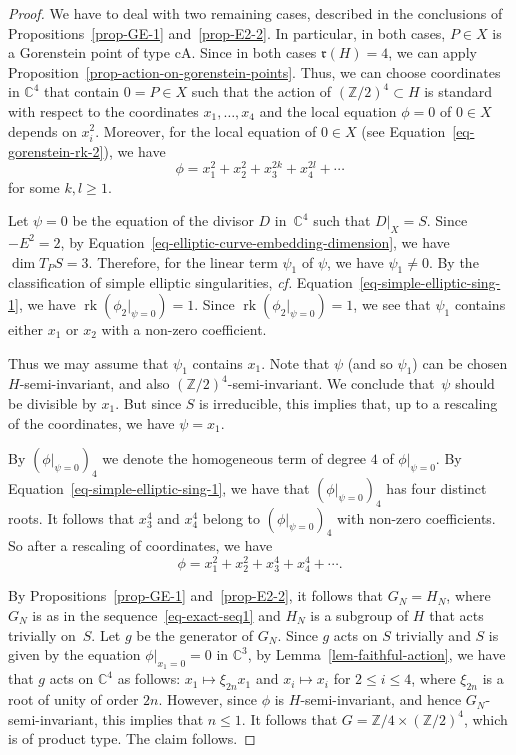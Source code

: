\documentclass[11pt]{amsart}
\numberwithin{equation}{section}
\theoremstyle{definition}
\theoremstyle{remark}
\DeclareMathOperator{\rk}{rk}
\begin{document}
\begin{proof}
  We have to deal with two remaining cases, described in the conclusions of Propositions~\ref{prop-GE-1} and~\ref{prop-E2-2}. In particular, in both cases, $P\in X$ is a Gorenstein point of type cA.  Since in both cases $\mathfrak{r}(H)=4$, we can apply Proposition~\ref{prop-action-on-gorenstein-points}.  Thus, we can choose coordinates in $\mathbb{C}^4$ that contain
  $0=P\in X$ such that the action of $(\mathbb{Z}/2)^4\subset H$ is standard with respect to the coordinates $x_1,\ldots, x_4$ and the local equation $\phi=0$ of $0\in X$ depends on $x_i^2$.  Moreover, for the local equation of $0\in X$ (see Equation~\eqref{eq-gorenstein-rk-2}), we have
\begin{equation}
\label{eq-phi-psi-equation}
\phi = x_1^2 + x_2^2 + x_3^{2k} + x_4^{2l} + \cdots
\end{equation}
for some $k, l\geq 1$. 

Let $\psi=0$ be the equation of the divisor $D$ in~$\mathbb{C}^4$ such that $D|_X = S$. Since $-E^2=2$, by Equation~\eqref{eq-elliptic-curve-embedding-dimension}, we have $\dim T_PS=3$. Therefore, for the linear term $\psi_1$ of $\psi$, we have $\psi_1\neq 0$.  By the classification of simple elliptic singularities, \textit{cf.} Equation~\eqref{eq-simple-elliptic-sing-1}, we have $\rk(\phi_2|_{\psi=0})=1$.  Since $\rk(\phi_2|_{\psi=0})=1$, we see that $\psi_1$ contains either $x_1$ or $x_2$ with a non-zero coefficient.

Thus we may assume that $\psi_1$ contains $x_1$.  Note that $\psi$ (and so $\psi_1$) can be chosen $H$-semi-invariant, and also $(\mathbb{Z}/2)^4$-semi-invariant.  We conclude that~$\psi$ should be divisible by $x_1$. But since $S$ is irreducible, this implies that, up to a rescaling of the coordinates, we have $\psi = x_1$.

By $(\phi|_{\psi=0})_4$ we denote the homogeneous term of degree $4$ of $\phi|_{\psi=0}$. 
By Equation~\eqref{eq-simple-elliptic-sing-1}, we have that $(\phi|_{\psi=0})_4$ has four distinct roots. It follows that $x_3^4$ and $x_4^4$ belong to $(\phi|_{\psi=0})_4$ with non-zero coefficients. So after a rescaling of coordinates, we have
\[
\phi = x_1^2 + x_2^2 + x_3^4 + x_4^4 + \cdots.
\]

By Propositions~\ref{prop-GE-1} and~\ref{prop-E2-2}, it follows that $G_N=H_N$, where $G_N$ is as in the sequence~\eqref{eq-exact-seq1} and $H_N$ is a subgroup of $H$ that acts trivially on~$S$.  
Let $g$ be the generator of $G_N$. Since $g$ acts on $S$ trivially and $S$ is given by the equation $\phi|_{x_1=0}=0$ in $\mathbb{C}^3$, by Lemma~\ref{lem-faithful-action}, we have that $g$ acts on $\mathbb{C}^4$ as follows: $x_1\mapsto \xi_{2n} x_1$ and $x_i\mapsto x_i$ for $2\leq i \leq 4$, where $\xi_{2n}$ is a root of unity of order $2n$. However, since $\phi$ is $H$-semi-invariant, and hence $G_N$-semi-invariant, this implies that $n\leq 1$. 
It follows that $G=\mathbb Z/4\times(\mathbb Z/2)^4$, which is of product type. The claim follows.
\end{proof}
\end{document}
